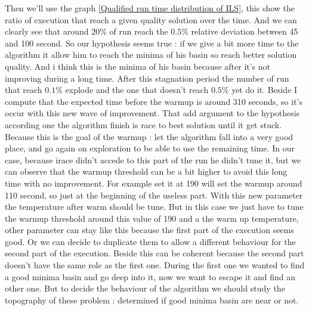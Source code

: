 \documentclass[12pt,a4paper]{article}
\begin{document}
Then we'll use the graph \ref{Qualified run time distribution of ILS}, this show the ratio of execution that reach a given quality solution over the time. And we can clearly see that around $20 \%$ of run reach the $0.5 \%$ relative deviation between 45 and 100 second. So our hypothesis seems true : if we give a bit more time to the algorithm it allow him to reach the minima of his basin so reach better solution quality. And i think this is the minima of his basin because after it's not improving during a long time. After this stagnation period the number of run that reach $0.1 \%$ explode and the one that doesn't reach $0.5 \%$ yet do it. Beside I compute that the expected time before the warmup is around 310 seconds, so it's occur with this new wave of improvement. That add argument to the hypothesis according one the algorithm finish is race to best solution until it get stuck. Because this is the goal of the warmup : let the algorithm fall into a very good place, and go again on exploration to be able to use the remaining time. In our case, because irace didn't accede to this part of the run he didn't tune it, but we can observe that the warmup threshold can be a bit higher to avoid this long time with no improvement. For example set it at 190 will set the warmup around 110 second, so just at the beginning of the useless part. With this new parameter the temperature after warm should be tune. But in this case we just have to tune the warmup threshold around this value of 190 and a the warm up temperature, other parameter can stay like this because the first part of the execution seems good. Or we can decide to duplicate them to allow a different behaviour for the second part of the execution. Beside this can be coherent because the second part doesn't have the same role as the first one. During the first one we wanted to find a good minima basin and go deep into it, now we want to escape it and find an other one. But to decide the behaviour of the algorithm we should study the topography of these problem : determined if good minima basin are near or not.\\
\end{document}
